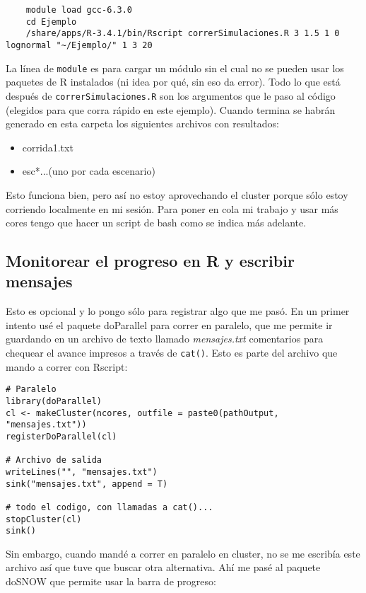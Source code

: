 \documentclass[paper=a4, fontsize=11pt]{article} %
\numberwithin{equation}{section} %
\numberwithin{figure}{section} %
\numberwithin{table}{section} %
\begin{document}
\begin{verbatim}
	module load gcc-6.3.0
	cd Ejemplo
	/share/apps/R-3.4.1/bin/Rscript correrSimulaciones.R 3 1.5 1 0 lognormal "~/Ejemplo/" 1 3 20
\end{verbatim}

La línea de \texttt{module} es para cargar un módulo sin el cual no se pueden usar los paquetes de R instalados (ni idea por qué, sin eso da error). Todo lo que está después de \texttt{correrSimulaciones.R} son los argumentos que le paso al código (elegidos para que corra rápido en este ejemplo). Cuando termina se habrán generado en esta carpeta los siguientes archivos con resultados:

\begin{itemize}
	\item corrida1.txt
	\item esc*...(uno por cada escenario)
\end{itemize}

Esto funciona bien, pero así no estoy aprovechando el cluster porque sólo estoy corriendo localmente en mi sesión. Para poner en cola mi trabajo y usar más cores tengo que hacer un script de bash como se indica más adelante.

\subsection{Monitorear el progreso en R y escribir mensajes}

Esto es opcional y lo pongo sólo para registrar algo que me pasó. En un primer intento usé el paquete doParallel para correr en paralelo, que me permite ir guardando en un archivo de texto llamado \textit{mensajes.txt} comentarios para chequear el avance impresos a través de \texttt{cat()}. Esto es parte del archivo que mando a correr con Rscript:

\begin{verbatim}
# Paralelo
library(doParallel)
cl <- makeCluster(ncores, outfile = paste0(pathOutput, "mensajes.txt"))
registerDoParallel(cl)

# Archivo de salida
writeLines("", "mensajes.txt")
sink("mensajes.txt", append = T)

# todo el codigo, con llamadas a cat()...				stopCluster(cl)
sink()
\end{verbatim}

Sin embargo, cuando mandé a correr en paralelo en cluster, no se me escribía este archivo así que tuve que buscar otra alternativa. Ahí me pasé al paquete doSNOW que permite usar la barra de progreso:
\end{document}
